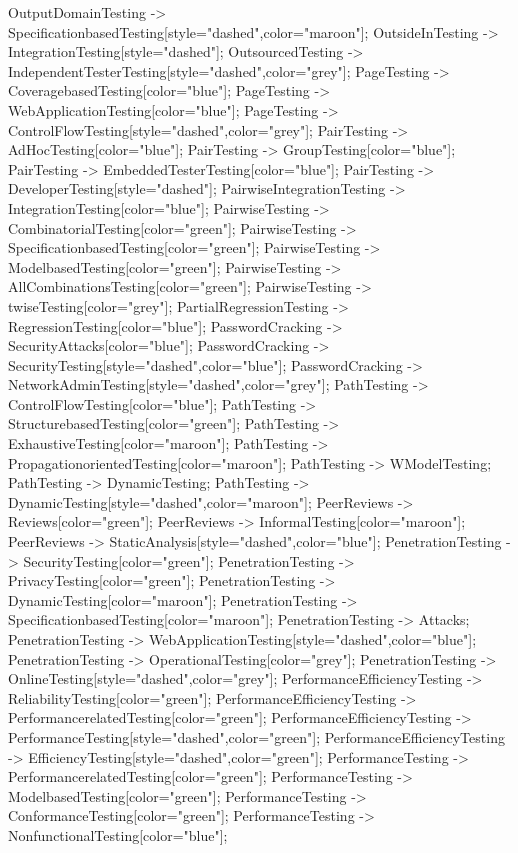 \documentclass{article}
\begin{document}
{OutputDomainTesting -> SpecificationbasedTesting[style="dashed",color="maroon"];
OutsideInTesting -> IntegrationTesting[style="dashed"];
OutsourcedTesting -> IndependentTesterTesting[style="dashed",color="grey"];
PageTesting -> CoveragebasedTesting[color="blue"];
PageTesting -> WebApplicationTesting[color="blue"];
PageTesting -> ControlFlowTesting[style="dashed",color="grey"];
PairTesting -> AdHocTesting[color="blue"];
PairTesting -> GroupTesting[color="blue"];
PairTesting -> EmbeddedTesterTesting[color="blue"];
PairTesting -> DeveloperTesting[style="dashed"];
PairwiseIntegrationTesting -> IntegrationTesting[color="blue"];
PairwiseTesting -> CombinatorialTesting[color="green"];
PairwiseTesting -> SpecificationbasedTesting[color="green"];
PairwiseTesting -> ModelbasedTesting[color="green"];
PairwiseTesting -> AllCombinationsTesting[color="green"];
PairwiseTesting -> twiseTesting[color="grey"];
PartialRegressionTesting -> RegressionTesting[color="blue"];
PasswordCracking -> SecurityAttacks[color="blue"];
PasswordCracking -> SecurityTesting[style="dashed",color="blue"];
PasswordCracking -> NetworkAdminTesting[style="dashed",color="grey"];
PathTesting -> ControlFlowTesting[color="blue"];
PathTesting -> StructurebasedTesting[color="green"];
PathTesting -> ExhaustiveTesting[color="maroon"];
PathTesting -> PropagationorientedTesting[color="maroon"];
PathTesting -> WModelTesting;
PathTesting -> DynamicTesting;
PathTesting -> DynamicTesting[style="dashed",color="maroon"];
PeerReviews -> Reviews[color="green"];
PeerReviews -> InformalTesting[color="maroon"];
PeerReviews -> StaticAnalysis[style="dashed",color="blue"];
PenetrationTesting -> SecurityTesting[color="green"];
PenetrationTesting -> PrivacyTesting[color="green"];
PenetrationTesting -> DynamicTesting[color="maroon"];
PenetrationTesting -> SpecificationbasedTesting[color="maroon"];
PenetrationTesting -> Attacks;
PenetrationTesting -> WebApplicationTesting[style="dashed",color="blue"];
PenetrationTesting -> OperationalTesting[color="grey"];
PenetrationTesting -> OnlineTesting[style="dashed",color="grey"];
PerformanceEfficiencyTesting -> ReliabilityTesting[color="green"];
PerformanceEfficiencyTesting -> PerformancerelatedTesting[color="green"];
PerformanceEfficiencyTesting -> PerformanceTesting[style="dashed",color="green"];
PerformanceEfficiencyTesting -> EfficiencyTesting[style="dashed",color="green"];
PerformanceTesting -> PerformancerelatedTesting[color="green"];
PerformanceTesting -> ModelbasedTesting[color="green"];
PerformanceTesting -> ConformanceTesting[color="green"];
PerformanceTesting -> NonfunctionalTesting[color="blue"];
}
\end{document}
